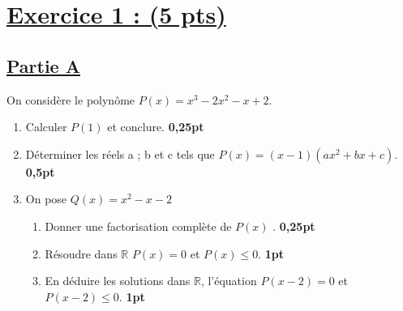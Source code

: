 \documentclass[12pt,a4paper]{article}
\begin{document}
\renewcommand{\arraystretch}{1.5}
\renewcommand{\arrayrulewidth}{1.2pt}

\vspace{3cm}
\section*{\underline{Exercice 1 : (5 pts)}}
\subsection*{\underline{Partie A}}
On considère le polynôme $P(x) = x^3 - 2x^2 - x + 2$.

\begin{enumerate}
    \item Calculer $P(1)$ et conclure. \hfill \textbf{0,25pt}
    
    \item Déterminer les réels a ; b et c tels que $P(x) = (x - 1)(ax^2 + bx + c)$. \hfill \textbf{0,5pt}
    
    \item On pose $Q(x) = x^2 - x - 2$
    \begin{enumerate}
        \item Donner une factorisation complète de $P(x)$ . \hfill \textbf{0,25pt}
        \item Résoudre dans $\mathbb{R}$  $P(x) = 0$ et $P(x) \leq 0$. \hfill \textbf{1pt}
        \item En déduire les solutions dans $\mathbb{R}$, l'équation $P(x-2) = 0$ et $P(x-2) \leq 0$. \hfill \textbf{1pt}
    \end{enumerate}
\end{enumerate}
\end{document}
